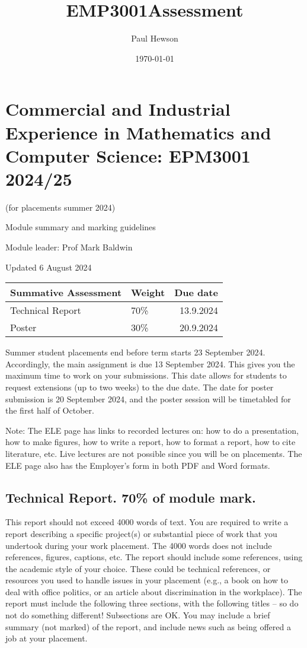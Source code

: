 \documentclass[11pt]{article}
\author{Paul Hewson}
\date{\today}
\title{EMP3001Assessment}
\begin{document}
\maketitle
\tableofcontents


\section{Commercial and Industrial Experience in Mathematics and Computer Science: EPM3001 2024/25}
\label{sec:orgede7ff4}
(for placements summer 2024)

Module summary and marking guidelines

Module leader: Prof Mark Baldwin

Updated 6 August 2024

\begin{center}
\begin{tabular}{llr}
Summative Assessment & Weight & Due date\\[0pt]
\hline
Technical Report & 70\% & 13.9.2024\\[0pt]
Poster & 30\% & 20.9.2024\\[0pt]
\end{tabular}
\end{center}


Summer student placements end before term starts 23 September 2024. Accordingly, the main assignment is due 13 September 2024. This gives you the maximum time to work on your submissions. This date allows for students to request extensions (up to two weeks) to the due date. The date for poster submission is 20 September 2024, and the poster session will be
timetabled for the first half of October.

Note: The ELE page has links to recorded lectures on: how to do a presentation, how to make figures, how to write a report, how to format a report, how to cite literature, etc. Live lectures are not possible since you will be on placements. The ELE page also has the Employer’s form in both PDF and Word formats.

\subsection{Technical Report. 70\% of module mark.}
\label{sec:org0e01878}
This report should not exceed 4000 words of text. You are required to write a report describing
a specific project(s) or substantial piece of work that you undertook during your work
placement. The 4000 words does not include references, figures, captions, etc. The report
should include some references, using the academic style of your choice. These could be
technical references, or resources you used to handle issues in your placement (e.g., a book on
how to deal with office politics, or an article about discrimination in the workplace).
The report must include the following three sections, with the following titles – so do not do
something different! Subsections are OK. You may include a brief summary (not marked) of the
report, and include news such as being offered a job at your placement.
\end{document}
